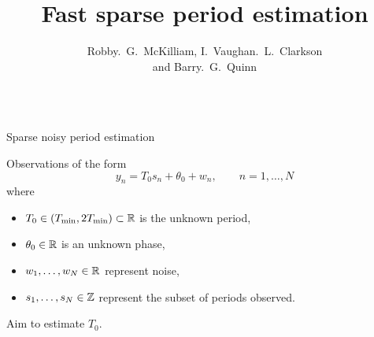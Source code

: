 \documentclass[final,hyperref={pdfpagelabels=false}]{beamer}
\title[]{Fast sparse period estimation}
\author{Robby.~G.~McKilliam, I.~Vaughan.~L.~Clarkson \\ and Barry.~G.~Quinn}
\begin{document}


\begin{columns}[t] %
\begin{column}{.49\textwidth} %

\newcommand{\Tmin}{T_{\text{min}}}
\newcommand{\Tmax}{2T_{\text{min}}}

\begin{block}{Sparse noisy period estimation}

Observations of the form
\[
y_n = T_0 s_n + \theta_0 + w_n, \qquad n = 1,\dots,N
\]
where
\begin{itemize}
\item $T_0 \in (\Tmin, \Tmax) \subset \reals$ is the unknown period,
\item $\theta_0 \in {\mathbb R}$ is an unknown phase,
\item $w_1,\dots,w_N \in {\mathbb R}$ represent noise,
\item $s_1,\dots,s_N \in {\mathbb Z}$ represent the subset of periods observed.
\end{itemize}
Aim to estimate $T_0$.

{
\def\vertgap{2}
\def\ph{0.4}
\def\T{1.1}

\newcommand{\raxis}{\draw[-> new,arrow head=2mm] (-0.25,0) -- (8,0) node[above] {$\reals$}; \draw (0,-0.06)-- node[below] {$0$} (0,0.06) }
\newcommand{\pulse}[1]{ \draw[-latex new,arrow head=4mm] (#1,0) -- (#1,1) }
\newcommand{\pulsewithnode}[2]{ \draw[-latex new,arrow head=4mm] (#1,0) -- node[right] {#2} (#1,1) }
\begin{figure}[t]
	\centering
{} 
		\label{fig_stat_model}
\end{figure}
}



\end{block}
\end{column}
\end{columns}
\end{document}
